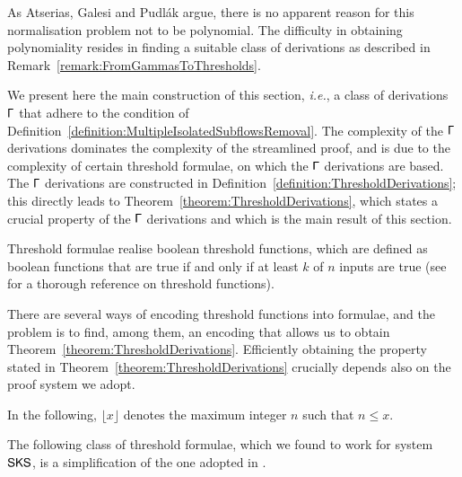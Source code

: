 As Atserias, Galesi and Pudl\'ak argue, there is no apparent reason for this normalisation problem not to be polynomial. The difficulty in obtaining polynomiality resides in finding a suitable class of derivations as described in Remark~\vref{remark:FromGammasToThresholds}.

We present here the main construction of this section, \emph{i.e.}, a class of derivations $\mathsf\Gamma$ that adhere to the condition of Definition~\vref{definition:MultipleIsolatedSubflowsRemoval}. The complexity of the $\mathsf\Gamma$ derivations dominates the complexity of the streamlined proof, and is due to the complexity of certain threshold formulae, on which the $\mathsf\Gamma$ derivations are based. The $\mathsf\Gamma$ derivations are constructed in Definition~\vref{definition:ThresholdDerivations}; this directly leads to Theorem~\vref{theorem:ThresholdDerivations}, which states a crucial property of the $\mathsf\Gamma$ derivations and which is the main result of this section.

Threshold formulae realise boolean threshold functions, which are defined as boolean functions that are true if and only if at least $k$ of $n$ inputs are true (see \cite{Wege:87:The-Comp:vn} for a thorough reference on threshold functions).

There are several ways of encoding threshold functions into formulae, and the problem is to find, among them, an encoding that allows us to obtain Theorem~\vref{theorem:ThresholdDerivations}. Efficiently obtaining the property stated in Theorem~\ref{theorem:ThresholdDerivations} crucially depends also on the proof system we adopt.

In the following, $\lfloor x\rfloor$ denotes the maximum integer $n$ such that $n\le x$.

The following class of threshold formulae, which we found to work for system $\mathsf{SKS}$, is a simplification of the one adopted in \cite{AtseGalePudl:02:Monotone:yu}.

\newcommand{\avecletter}{{\boldsymbol a}}
\newcommand{\avec}[2]{\avecletter_{#1}^{#2}}
\begin{definition}\label{definition:AtomVector}
\TODO{Define $\avec1n$.}
\end{definition}

